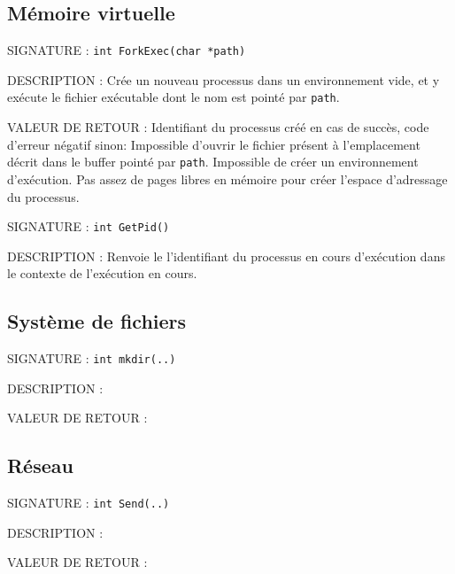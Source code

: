 \documentclass{article}
\begin{document}
	\subsection{Mémoire virtuelle}
		\begin{description}
			\item{SIGNATURE : } \texttt{int ForkExec(char *path)}
			\item{DESCRIPTION : } Crée un nouveau processus dans un environnement vide, et y exécute le fichier exécutable dont le nom est pointé par \texttt{path}.
			\item{VALEUR DE RETOUR : } Identifiant du processus créé en cas de succès, code d'erreur négatif sinon:
				 Impossible d'ouvrir le fichier présent à l'emplacement décrit dans le buffer pointé par \texttt{path}.
				 Impossible de créer un environnement d'exécution.
				 Pas assez de pages libres en mémoire pour créer l'espace d'adressage du processus.
		\end{description}
		\vspace{2.5mm}
		\begin{description}
			\item{SIGNATURE : } \texttt{int GetPid()}
			\item{DESCRIPTION : Renvoie le l'identifiant du processus en cours d'exécution dans le contexte de l'exécution en cours. } 
		\end{description}
		
	\subsection{Système de fichiers}
		\begin{description}
			\item{SIGNATURE : } \texttt{int mkdir(..)}
			\item{DESCRIPTION : } 
			\item{VALEUR DE RETOUR : } 
				\subitem{\texttt{-1} : } 
		\end{description}
		\vspace{2.5mm}
	
	\subsection{Réseau}
		\begin{description}
			\item{SIGNATURE : } \texttt{int Send(..)}
			\item{DESCRIPTION : } 
			\item{VALEUR DE RETOUR : } 
				\subitem{\texttt{-1} : } 
				\subitem{\texttt{-2} : } 
				\subitem{\texttt{-3} : } 
		\end{description}
		\vspace{2.5mm}
\end{document}
